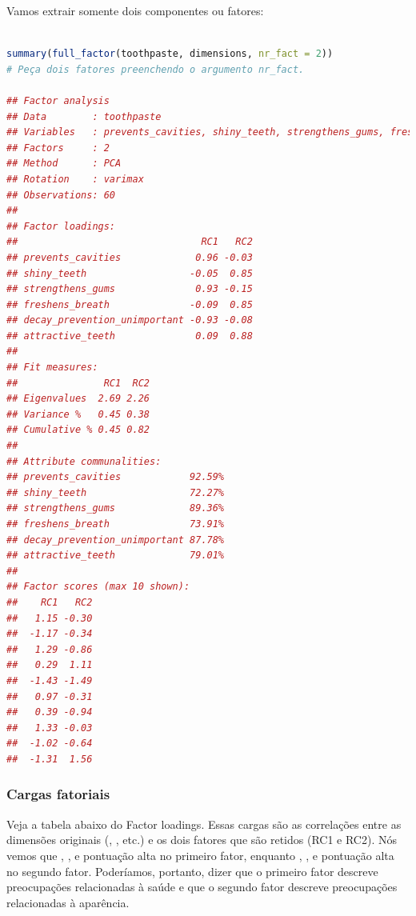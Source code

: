 \documentclass{article}
\begin{document}
Vamos extrair somente dois componentes ou fatores:
\begin{lstlisting}[language=R]

summary(full_factor(toothpaste, dimensions, nr_fact = 2))
# Peça dois fatores preenchendo o argumento nr_fact.

## Factor analysis
## Data        : toothpaste 
## Variables   : prevents_cavities, shiny_teeth, strengthens_gums, freshens_breath, decay_prevention_unimportant, attractive_teeth 
## Factors     : 2 
## Method      : PCA 
## Rotation    : varimax 
## Observations: 60 
## 
## Factor loadings:
##                                RC1   RC2
## prevents_cavities             0.96 -0.03
## shiny_teeth                  -0.05  0.85
## strengthens_gums              0.93 -0.15
## freshens_breath              -0.09  0.85
## decay_prevention_unimportant -0.93 -0.08
## attractive_teeth              0.09  0.88
## 
## Fit measures:
##               RC1  RC2
## Eigenvalues  2.69 2.26
## Variance %   0.45 0.38
## Cumulative % 0.45 0.82
## 
## Attribute communalities:                                   
## prevents_cavities            92.59%
## shiny_teeth                  72.27%
## strengthens_gums             89.36%
## freshens_breath              73.91%
## decay_prevention_unimportant 87.78%
## attractive_teeth             79.01%
## 
## Factor scores (max 10 shown):
##    RC1   RC2
##   1.15 -0.30
##  -1.17 -0.34
##   1.29 -0.86
##   0.29  1.11
##  -1.43 -1.49
##   0.97 -0.31
##   0.39 -0.94
##   1.33 -0.03
##  -1.02 -0.64
##  -1.31  1.56
\end{lstlisting}

\newpage 
\subsubsection{Cargas fatoriais}

Veja a tabela abaixo do Factor loadings. Essas cargas são as correlações entre as dimensões originais (, , etc.) e os dois fatores que são retidos (RC1 e RC2). Nós vemos que , , e  pontuação alta no primeiro fator, enquanto , , e  pontuação alta no segundo fator. Poderíamos, portanto, dizer que o primeiro fator descreve preocupações relacionadas à saúde e que o segundo fator descreve preocupações relacionadas à aparência.
\end{document}
